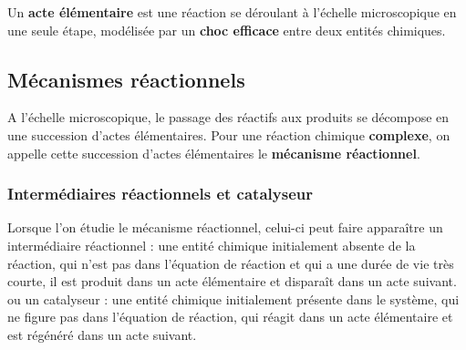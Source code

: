 \documentclass[a4paper,13pt,fleqn]{scrartcl}%
\begin{document}
\begin{figure}[h!]
{
}
\end{figure}

Un \textbf{acte élémentaire} est une réaction se déroulant à l'échelle microscopique en une seule étape, modélisée par un \textbf{choc efficace} entre deux entités chimiques.

	\subsection{Mécanismes réactionnels}
A l'échelle microscopique, le passage des réactifs aux produits se décompose en une succession d'actes élémentaires. Pour une réaction chimique \textbf{complexe}, on appelle cette succession d'actes élémentaires le \textbf{mécanisme réactionnel}.
		\subsubsection{Intermédiaires réactionnels et catalyseur}
Lorsque l'on étudie le mécanisme réactionnel, celui-ci peut faire apparaître un intermédiaire réactionnel : une entité chimique initialement absente de la réaction, qui n'est pas dans l'équation de réaction et qui a une durée de vie très courte, il est produit dans un acte élémentaire et disparaît dans un acte suivant. ou un catalyseur : une entité chimique initialement présente dans le système, qui ne figure pas dans l'équation de réaction, qui réagit dans un acte élémentaire et est régénéré dans un acte suivant.\\
\end{document}

